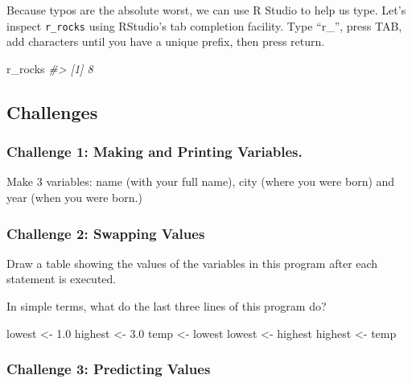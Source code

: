 \documentclass[]{book}
\newenvironment{Shaded}{\begin{snugshade}}{\end{snugshade}}
\newcommand{\FloatTok}[1]{\textcolor[rgb]{0.00,0.00,0.81}{#1}}
\newcommand{\StringTok}[1]{\textcolor[rgb]{0.31,0.60,0.02}{#1}}
\newcommand{\CommentTok}[1]{\textcolor[rgb]{0.56,0.35,0.01}{\textit{#1}}}
\newcommand{\NormalTok}[1]{#1}
\begin{document}
Because typos are the absolute worst, we can use R Studio to help us
type. Let's inspect \texttt{r\_rocks} using RStudio's tab completion
facility. Type ``r\_'', press TAB, add characters until you have a
unique prefix, then press return.

\begin{Shaded}
\begin{Highlighting}[]
\NormalTok{r_rocks}
\CommentTok{#> [1] 8}
\end{Highlighting}
\end{Shaded}

\subsection{Challenges}\label{challenges-2}

\subsubsection*{Challenge 1: Making and Printing
Variables.}\label{challenge-1-making-and-printing-variables.}

Make 3 variables: name (with your full name), city (where you were born)
and year (when you were born.)

\subsubsection*{Challenge 2: Swapping
Values}\label{challenge-2-swapping-values}

Draw a table showing the values of the variables in this program after
each statement is executed.

In simple terms, what do the last three lines of this program do?

\begin{Shaded}
\begin{Highlighting}[]
\NormalTok{lowest <-}\StringTok{ }\FloatTok{1.0}
\NormalTok{highest <-}\StringTok{ }\FloatTok{3.0}
\NormalTok{temp <-}\StringTok{ }\NormalTok{lowest}
\NormalTok{lowest <-}\StringTok{ }\NormalTok{highest}
\NormalTok{highest <-}\StringTok{ }\NormalTok{temp}
\end{Highlighting}
\end{Shaded}

\subsubsection*{Challenge 3: Predicting
Values}\label{challenge-3-predicting-values}
\end{document}
